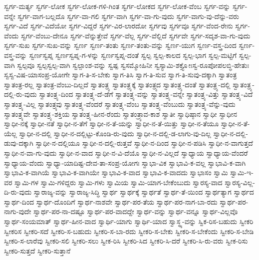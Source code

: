 {ಸ್ವರ್ಗ-ಮರ್ತ್ಯ
ಸ್ವರ್ಗ-ಲೋಕ
ಸ್ವರ್ಗ-ಲೋಕ-ಗಳಿ-ಗಿಂತ
ಸ್ವರ್ಗ-ಲೋಕದ
ಸ್ವರ್ಗ-ಲೋಕ-ವೆಂಬ
ಸ್ವರ್ಗ-ವನ್ನು
ಸ್ವರ್ಗ-ವನ್ನೇ
ಸ್ವರ್ಗ-ವಾಗ-ಬಲ್ಲದೊ
ಸ್ವರ್ಗ-ವಾ-ಗಲಿ
ಸ್ವರ್ಗ-ವಾಗಿ
ಸ್ವರ್ಗ-ವಾ-ಗು-ವುದು
ಸ್ವರ್ಗ-ವಾಗು-ವು-ದೆನ್ನು-ವರು
ಸ್ವರ್ಗ-ವಿದೆ
ಸ್ವರ್ಗ-ವಿದೆಯೋ
ಸ್ವರ್ಗ-ವಿದ್ದರೆ
ಸ್ವರ್ಗ-ವಿರ-ಲಾರದೋ
ಸ್ವರ್ಗವು
ಸ್ವರ್ಗವೂ
ಸ್ವರ್ಗ-ವೆಂದ-ರೇನು
ಸ್ವರ್ಗ-ವೆಂದು
ಸ್ವರ್ಗ-ವೆಂಬು-ದೇನೂ
ಸ್ವರ್ಗ-ವೆನ್ನುತ್ತೇವೆ
ಸ್ವರ್ಗ-ವೆಲ್ಲ
ಸ್ವರ್ಗ-ವೆಲ್ಲಿದೆ
ಸ್ವರ್ಗವೇ
ಸ್ವರ್ಗ-ಸದೃಶ-ವಾ-ಗು-ವುದು
ಸ್ವರ್ಗ-ಸುಖ
ಸ್ವರ್ಗ-ಸುಖ-ವನ್ನು
ಸ್ವರ್ಣ
ಸ್ವರ್ಣ-ತಂತು
ಸ್ವರ್ಣ-ತಂತು-ವನ್ನು
ಸ್ವರ್ಣ-ಯುಗ
ಸ್ವರ್ಣ-ವಸ್ತ್ರ-ದಿಂದ
ಸ್ವರ್ಣ-ವಸ್ತ್ರ-ವನ್ನು
ಸ್ವರ್ಣಸ್ವಪ್ನ
ಸ್ವರ್ಣಸ್ವಪ್ನ-ಗ-ಳನ್ನು
ಸ್ವರ್ಣಸ್ವಪ್ನ-ದಂತೆ
ಸ್ವಲ್ಪ
ಸ್ವಲ್ಪ-ಕಾಲದ
ಸ್ವಲ್ಪ-ಭಾಗ
ಸ್ವಲ್ಪ-ಮಟ್ಟಿಗೆ
ಸ್ವಲ್ಪ-ವಾಗಿ
ಸ್ವಲ್ಪವೂ
ಸ್ವಲ್ಪಸ್ವಲ್ಪ-ವಾಗಿ
ಸ್ವಲ್ಪಾಂಶ-ವನ್ನು
ಸ್ವಷ್ಪ
ಸ್ವಸಮ್ಮೋಹಿನೀ
ಸ್ವಸ್ಯಾಮಿ-ಶಕ್ತ್ಯೋಃಸ್ವ-ರೂಪೋಪಲಬ್ಧಿ-ಹೇತುಃ
ಸ್ವಸ್ವ-ವಿಷ-ಯಾಸಂಪ್ರ-ಯೋಗೇ
ಸ್ವಾಗ-ತಿ-ಸ-ಬೇಕು
ಸ್ವಾಗ-ತಿಸಿ
ಸ್ವಾಗ-ತಿ-ಸುವ
ಸ್ವಾಗ-ತಿ-ಸುವು-ದಕ್ಕಾಗಿ
ಸ್ವಾತಂತ್ರ
ಸ್ವಾತಂತ್ರ-ರಲ್ಲ
ಸ್ವಾತಂತ್ರ-ವೆಂಬು-ದಿಲ್ಲದೆ
ಸ್ವಾತಂತ್ರ್ಯ
ಸ್ವಾತಂತ್ರ್ಯಕ್ಕೆ
ಸ್ವಾತಂತ್ರ್ಯದ
ಸ್ವಾತಂತ್ರ್ಯ-ದಂತೆ
ಸ್ವಾತಂತ್ರ್ಯ-ದಲ್ಲಿ
ಸ್ವಾತಂತ್ರ್ಯ-ದಲ್ಲಿ-ರು-ವುದು
ಸ್ವಾತಂತ್ರ್ಯ-ದಿಂದ
ಸ್ವಾತಂತ್ರ್ಯ-ದೆ-ಡೆಗೆ
ಸ್ವಾತಂತ್ರ್ಯ-ವನ್ನು
ಸ್ವಾತಂತ್ರ್ಯ-ವನ್ನೇ
ಸ್ವಾತಂತ್ರ್ಯ-ವಿತ್ತು
ಸ್ವಾತಂತ್ರ್ಯ-ವಿದೆ
ಸ್ವಾತಂತ್ರ್ಯ-ವಿಲ್ಲ
ಸ್ವಾತಂತ್ರ್ಯವು
ಸ್ವಾತಂತ್ರ್ಯ-ವೆಂದರೆ
ಸ್ವಾತಂತ್ರ್ಯ-ವೆಂಬ
ಸ್ವಾತಂತ್ರ್ಯ-ವೆಂಬುದು
ಸ್ವಾತಂತ್ರ್ಯ-ವೆನ್ನು-ವುದು
ಸ್ವಾತಂತ್ರ್ಯವೇ
ಸ್ವಾತಂತ್ರ್ಯ-ಶಕ್ತಿಯ
ಸ್ವಾತಂತ್ರ್ಯ-ಹೀನ-ರೆಂದು
ಸ್ವಾತಂತ್ರ್ಯಾವ-ಕಾಶ
ಸ್ವಾತೀ
ಸ್ವಾಧಿಷ್ಠಾನ
ಸ್ವಾಧೀ
ಸ್ವಾಧೀನ
ಸ್ವಾಧೀ-ನಕ್ಕೆ
ಸ್ವಾಧೀ-ನತೆ
ಸ್ವಾಧೀ-ನ-ತೆಗೆ
ಸ್ವಾಧೀ-ನ-ತೆ-ಯನ್ನು
ಸ್ವಾಧೀ-ನ-ತೆ-ಯಿತ್ತು
ಸ್ವಾಧೀ-ನ-ತೆಯೂ
ಸ್ವಾಧೀ-ನ-ತೆ-ಯೆಲ್ಲ
ಸ್ವಾಧೀ-ನ-ದಲ್ಲಿ
ಸ್ವಾಧೀ-ನ-ದಲ್ಲಿಟ್ಟು-ಕೊಂಡಿ-ರು-ವುದು
ಸ್ವಾಧೀ-ನ-ದಲ್ಲಿ-ಡ-ಲಾಗು-ವು-ದಿಲ್ಲ
ಸ್ವಾಧೀ-ನ-ದಲ್ಲಿ-ಡುವು-ದಕ್ಕಾಗಿ
ಸ್ವಾಧೀ-ನ-ದಲ್ಲಿಯೂ
ಸ್ವಾಧೀ-ನ-ದಲ್ಲಿ-ರುತ್ತವೆ
ಸ್ವಾಧೀ-ನ-ದಿಂದ
ಸ್ವಾಧೀ-ನ-ಪಡಿಸಿ
ಸ್ವಾಧೀ-ನ-ವಾಗುತ್ತದೆ
ಸ್ವಾಧೀ-ನ-ವಾ-ಗು-ವುದು
ಸ್ವಾಧೀ-ನ-ವಾದ
ಸ್ವಾಧೀ-ನ-ವಿ-ದೆಯೊ
ಸ್ವಾಧೀ-ನ-ವಿಲ್ಲದೆ
ಸ್ವಾಧ್ಯಾಯ
ಸ್ವಾಧ್ಯಾಯ-ವೆಂದರೆ
ಸ್ವಾಧ್ಯಾಯ-ವೆಂದು
ಸ್ವಾಧ್ಯಾ-ಯಾದಿಷ್ಟ-ದೇವ-ತಾ-ಸಂಪ್ರ-ಯೋಗಃ
ಸ್ವಾಭಾ-ವಿಕ
ಸ್ವಾಭಾವಿ-ಕ-ವಲ್ಲ
ಸ್ವಾಭಾವಿ-ಕ-ವಾಗಿ
ಸ್ವಾಭಾವಿ-ಕ-ವಾಗಿಯೆ
ಸ್ವಾಭಾವಿ-ಕ-ವಾಗಿಯೇ
ಸ್ವಾಭಾವಿ-ಕ-ವಾದ
ಸ್ವಾಭಾವಿ-ಕ-ವಾದದು
ಸ್ವಾಭಾಸಂ
ಸ್ವಾಮಿ
ಸ್ವಾಮಿ-ಇ-ವರ
ಸ್ವಾಮಿ-ಗಳ
ಸ್ವಾಮಿ-ಗಳಿದ್ದರು
ಸ್ವಾಮಿ-ಗಳು
ಸ್ವಾಮಿಯ
ಸ್ವಾಮಿ-ಯಾಗ-ಬೇಕೆಂಬುದು
ಸ್ವಾರಸ್ಯ-ವಾದ
ಸ್ವಾರಸ್ಯ-ವಿಲ್ಲ-ದಿ-ರು-ವುದು
ಸ್ವಾರಾಜ್ಯ-ವನ್ನು
ಸ್ವಾರಾಜ್ಯ-ಸಿದ್ಧಿ
ಸ್ವಾರ್ಥ
ಸ್ವಾರ್ಥಕ್ಕೆ
ಸ್ವಾರ್ಥತೆ
ಸ್ವಾರ್ಥ-ತೆ-ಯಿಂದ
ಸ್ವಾರ್ಥತ್ಯಾಗ
ಸ್ವಾರ್ಥದ
ಸ್ವಾರ್ಥ-ದಿಂದ
ಸ್ವಾರ್ಥ-ದೊಂದಿಗೆ
ಸ್ವಾರ್ಥ-ನಾಶವೇ
ಸ್ವಾರ್ಥ-ಪರ-ತೆಯ
ಸ್ವಾರ್ಥ-ಪರ-ನಾಗ-ಬಾ-ರದು
ಸ್ವಾರ್ಥ-ಪರ-ನಾಗು-ವುದೇ
ಸ್ವಾರ್ಥ-ಪರ-ನಾ-ದಷ್ಟೂ
ಸ್ವಾರ್ಥ-ಪರ-ವಾದದ್ದೇ
ಸ್ವಾರ್ಥ-ವನ್ನು
ಸ್ವಾರ್ಥ-ವನ್ನೂ
ಸ್ವಾರ್ಥ-ವಿಲ್ಲವೊ
ಸ್ವಾರ್ಥ-ಸಂಯಮಾತ್
ಸ್ವಾರ್ಥ-ಹೀನ-ವಾದ
ಸ್ವಾರ್ಥಿ-ಯಾಗು
ಸ್ವಾರ್ಥಿ-ಯಾದ
ಸ್ವಾಸ್ಥ್ಯ-ವನ್ನು
ಸ್ವಿಕ-ರಿಸ-ಬಹುದು
ಸ್ವೀಕರಿ
ಸ್ವೀಕರಿಸ
ಸ್ವೀಕರಿ-ಸದೆ
ಸ್ವೀಕರಿ-ಸ-ಬಹುದು
ಸ್ವೀಕರಿ-ಸ-ಬಾ-ರದು
ಸ್ವೀಕರಿ-ಸ-ಬೇಕು
ಸ್ವೀಕರಿ-ಸ-ಬೇಕೆಂದು
ಸ್ವೀಕರಿ-ಸ-ಬೇಡಿ
ಸ್ವೀಕರಿ-ಸ-ಲಾರೆವು
ಸ್ವೀಕರಿ-ಸಲಿ
ಸ್ವೀಕರಿ-ಸಲು
ಸ್ವೀಕ-ರಿಸಿ
ಸ್ವೀಕರಿ-ಸಿದ
ಸ್ವೀಕರಿ-ಸಿ-ದರೆ
ಸ್ವೀಕರಿ-ಸಿ-ರು-ವರು
ಸ್ವೀಕ-ರಿಸು
ಸ್ವೀಕರಿ-ಸುತ್ತದೆ
ಸ್ವೀಕರಿ-ಸುತ್ತಾನೆ
}
